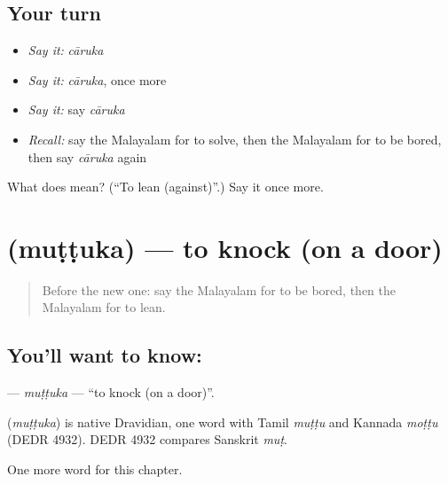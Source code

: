 \subsection*{Your turn}
\begin{itemize}
\raggedright
  \item \emph{Say it:} \emph{cāruka}
  \item \emph{Say it:} \emph{cāruka}, once more
  \item \emph{Say it:} say \emph{cāruka}
  \item \emph{Recall:} say the Malayalam for to solve, then the Malayalam for to be bored, then say \emph{cāruka} again
\end{itemize}

\begin{tcolorbox}[breakable,colback=teal!4,colframe=teal!35!black,title={Before you move on}]
What does  mean? (\textquotedblleft{}To lean (against)\textquotedblright{}.) Say it once more.
\end{tcolorbox}
\section[\texorpdfstring{\ml{മുട്ടുക} (muṭṭuka)}{മുട്ടുക (muṭṭuka)}]{ (muṭṭuka) — to knock (on a door)}

\label{lesson:ML-C231-muttuka}



\begin{quote}
Before the new one: say the Malayalam for to be bored, then the Malayalam for to lean.
\end{quote}

\subsection*{You'll want to know: }
\textbf{} — \emph{muṭṭuka} — \textquotedblleft{}to knock (on a door)\textquotedblright{}.

\begin{cousinweb}
\textbf{} (\emph{muṭṭuka}) is native Dravidian, one word with Tamil \emph{muṭṭu} and Kannada \emph{moṭṭu} (DEDR 4932). DEDR 4932 compares Sanskrit \emph{muṭ}.
\end{cousinweb}

\begin{grammarlens}[title={What you've built}]
One more word for this chapter.
\end{grammarlens}

